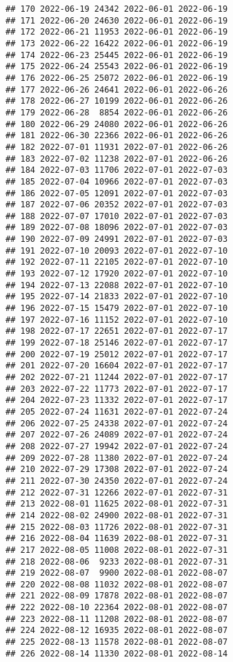 \documentclass[
]{article}
\begin{document}
\begin{verbatim}
## 170 2022-06-19 24342 2022-06-01 2022-06-19
## 171 2022-06-20 24630 2022-06-01 2022-06-19
## 172 2022-06-21 11953 2022-06-01 2022-06-19
## 173 2022-06-22 16422 2022-06-01 2022-06-19
## 174 2022-06-23 25445 2022-06-01 2022-06-19
## 175 2022-06-24 25543 2022-06-01 2022-06-19
## 176 2022-06-25 25072 2022-06-01 2022-06-19
## 177 2022-06-26 24641 2022-06-01 2022-06-26
## 178 2022-06-27 10199 2022-06-01 2022-06-26
## 179 2022-06-28  8854 2022-06-01 2022-06-26
## 180 2022-06-29 24080 2022-06-01 2022-06-26
## 181 2022-06-30 22366 2022-06-01 2022-06-26
## 182 2022-07-01 11931 2022-07-01 2022-06-26
## 183 2022-07-02 11238 2022-07-01 2022-06-26
## 184 2022-07-03 11706 2022-07-01 2022-07-03
## 185 2022-07-04 10966 2022-07-01 2022-07-03
## 186 2022-07-05 12091 2022-07-01 2022-07-03
## 187 2022-07-06 20352 2022-07-01 2022-07-03
## 188 2022-07-07 17010 2022-07-01 2022-07-03
## 189 2022-07-08 18096 2022-07-01 2022-07-03
## 190 2022-07-09 24991 2022-07-01 2022-07-03
## 191 2022-07-10 20093 2022-07-01 2022-07-10
## 192 2022-07-11 22105 2022-07-01 2022-07-10
## 193 2022-07-12 17920 2022-07-01 2022-07-10
## 194 2022-07-13 22088 2022-07-01 2022-07-10
## 195 2022-07-14 21833 2022-07-01 2022-07-10
## 196 2022-07-15 15479 2022-07-01 2022-07-10
## 197 2022-07-16 11152 2022-07-01 2022-07-10
## 198 2022-07-17 22651 2022-07-01 2022-07-17
## 199 2022-07-18 25146 2022-07-01 2022-07-17
## 200 2022-07-19 25012 2022-07-01 2022-07-17
## 201 2022-07-20 16604 2022-07-01 2022-07-17
## 202 2022-07-21 11244 2022-07-01 2022-07-17
## 203 2022-07-22 11773 2022-07-01 2022-07-17
## 204 2022-07-23 11332 2022-07-01 2022-07-17
## 205 2022-07-24 11631 2022-07-01 2022-07-24
## 206 2022-07-25 24338 2022-07-01 2022-07-24
## 207 2022-07-26 24089 2022-07-01 2022-07-24
## 208 2022-07-27 19942 2022-07-01 2022-07-24
## 209 2022-07-28 11380 2022-07-01 2022-07-24
## 210 2022-07-29 17308 2022-07-01 2022-07-24
## 211 2022-07-30 24350 2022-07-01 2022-07-24
## 212 2022-07-31 12266 2022-07-01 2022-07-31
## 213 2022-08-01 11625 2022-08-01 2022-07-31
## 214 2022-08-02 24900 2022-08-01 2022-07-31
## 215 2022-08-03 11726 2022-08-01 2022-07-31
## 216 2022-08-04 11639 2022-08-01 2022-07-31
## 217 2022-08-05 11008 2022-08-01 2022-07-31
## 218 2022-08-06  9233 2022-08-01 2022-07-31
## 219 2022-08-07  9900 2022-08-01 2022-08-07
## 220 2022-08-08 11032 2022-08-01 2022-08-07
## 221 2022-08-09 17878 2022-08-01 2022-08-07
## 222 2022-08-10 22364 2022-08-01 2022-08-07
## 223 2022-08-11 11208 2022-08-01 2022-08-07
## 224 2022-08-12 16935 2022-08-01 2022-08-07
## 225 2022-08-13 11578 2022-08-01 2022-08-07
## 226 2022-08-14 11330 2022-08-01 2022-08-14

\end{verbatim}
\end{document}
